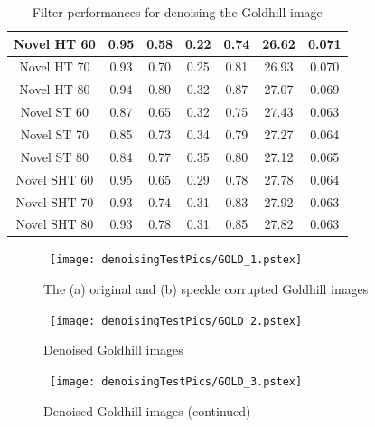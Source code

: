 \documentclass[12pt]{report}
\renewcommand{\baselinestretch}{1.5}
\begin{document}
\begin{table}[p]
\begin{center}
\begin{scriptsize}
\begin{tabular}{|c|c|c|c|c|c|c|}

Novel HT 60		& 0.95	& 0.58		& 0.22		& 0.74	& 26.62		& 0.071		\\ \hline
Novel HT 70		& 0.93	& 0.70		& 0.25		& 0.81	& 26.93		& 0.070		\\ \hline
Novel HT 80		& 0.94	& 0.80		& 0.32		& 0.87	& 27.07		& 0.069		\\ \hline \hline

Novel ST 60		& 0.87	& 0.65		& 0.32		& 0.75	& 27.43		& 0.063		\\ \hline
Novel ST 70		& 0.85	& 0.73		& 0.34		& 0.79	& 27.27		& 0.064		\\ \hline
Novel ST 80		& 0.84	& 0.77		& 0.35		& 0.80	& 27.12		& 0.065		\\ \hline \hline

Novel SHT 60		& 0.95	& 0.65		& 0.29		& 0.78	& 27.78		& 0.064		\\ \hline
Novel SHT 70		& 0.93	& 0.74		& 0.31		& 0.83	& 27.92		& 0.063		\\ \hline	
Novel SHT 80 		& 0.93	& 0.78		& 0.31		& 0.85	& 27.82		& 0.063		\\ \hline	

\end{tabular}
\end{scriptsize}
\end{center}
\caption{Filter performances for denoising the Goldhill image}
\label{tab:GoldhillDN}
\renewcommand{\baselinestretch}{1.5}
\setlength{\abovecaptionskip}{0cm}
\end{table}

\begin{figure}[p]
	\centerline{ \hbox{
                \texttt{[image: denoisingTestPics/GOLD\_1.pstex]}
	}}
        \caption{The (a) original and (b) speckle corrupted Goldhill images}
	\label{fig:gold_a}
\end{figure}
\begin{figure}[p]
	\centerline{ \hbox{
                \texttt{[image: denoisingTestPics/GOLD\_2.pstex]}
	}}
        \caption{Denoised Goldhill images} 
	\label{fig:gold_b}
\end{figure}
\begin{figure}[p]
	\centerline{ \hbox{
                \texttt{[image: denoisingTestPics/GOLD\_3.pstex]}
	}}
        \caption{Denoised Goldhill images (continued)} 
	\label{fig:gold_c}
\end{figure}
\end{document}
